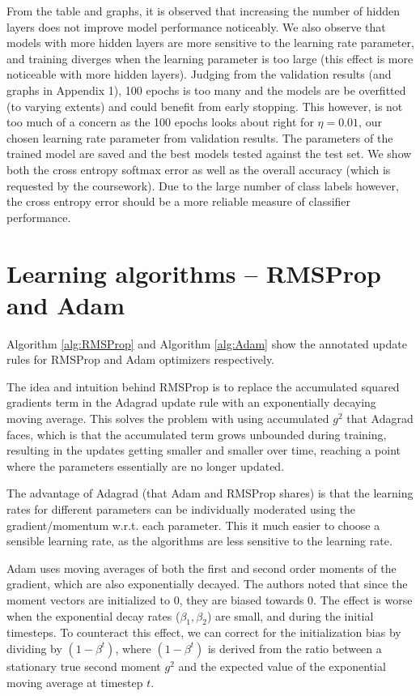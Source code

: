 \documentclass{article}
\begin{document}
From the table and graphs, it is observed that increasing the number of hidden layers does not improve model performance noticeably. We also observe that models with more hidden layers are more sensitive to the learning rate parameter, and training diverges when the learning parameter is too large (this effect is more noticeable with more hidden layers). Judging from the validation results (and graphs in Appendix 1), 100 epochs is too many and the models are be overfitted (to varying extents) and could benefit from early stopping. This however, is not too much of a concern as the 100 epochs looks about right for $\eta=0.01$, our chosen learning rate parameter from validation results. The parameters of the trained model are saved and the best models tested against the test set. We show both the cross entropy softmax error as well as the overall accuracy (which is requested by the coursework). Due to the large number of class labels however, the cross entropy error should be a more reliable measure of classifier performance. 

\section{Learning algorithms -- RMSProp and Adam}
Algorithm \ref{alg:RMSProp} and Algorithm \ref{alg:Adam} show the annotated update rules for RMSProp and Adam optimizers respectively.

The idea and intuition behind RMSProp is to replace the accumulated squared gradients term in the Adagrad \cite{duchi2011adaptive} update rule with an exponentially decaying moving average. This solves the problem with using accumulated $g^2$ that Adagrad faces, which is that the accumulated term grows unbounded during training, resulting in the updates getting smaller and smaller over time, reaching a point where the parameters essentially are no longer updated.

The advantage of Adagrad (that Adam and RMSProp shares) is that the learning rates for different parameters can be individually moderated using the gradient/momentum w.r.t. each parameter. This it much easier to choose a sensible learning rate, as the algorithms are less sensitive to the learning rate.

Adam uses moving averages of both the first and second order moments of the gradient, which are also exponentially decayed. The authors noted that since the moment vectors are initialized to 0, they are biased towards 0. The effect is worse when the exponential decay rates ($\beta_1, \beta_2$) are small, and during the initial timesteps. To counteract this effect, we can correct for the initialization bias by dividing by $(1 - \beta^t)$, where $(1 - \beta^t)$ is derived from the ratio between a stationary true second moment $g^2$ and the expected value of the exponential moving average at timestep $t$.
\end{document}
